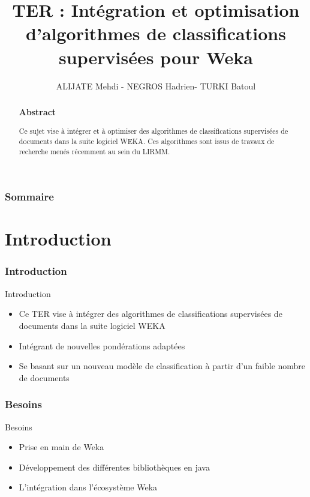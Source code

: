 \documentclass[12pt]{beamer}
\author{ALIJATE Mehdi -  NEGROS Hadrien- TURKI Batoul}
\title{TER :  Intégration et optimisation d’algorithmes de classifications supervisées pour Weka
}
\institute{Université Montpellier 2 - LIRMM}
\begin{document}
\begin{frame}
\titlepage 
\end{frame}

\begin{frame}
\begin{abstract}

\frametitle{Abstract}
\begin{center}
Ce sujet vise à intégrer et à optimiser des algorithmes de classifications supervisées de documents dans la suite logiciel WEKA. Ces algorithmes sont issus de travaux de recherche menés récemment au sein du LIRMM.
\end{center}
\end{abstract}
\end{frame}

\begin{frame}
\tableofcontents
\frametitle{Sommaire}


\end{frame}


\section{Introduction}



\begin{frame}
\frametitle{Introduction}
\begin{block}{Introduction}
\begin{itemize}
\item Ce TER vise à intégrer des algorithmes de classifications supervisées de documents dans la suite logiciel WEKA 
\item Intégrant de nouvelles pondérations adaptées
\item Se basant sur un nouveau modèle de classification à partir d’un faible nombre de documents
\end{itemize} 
\end{block}
\end{frame}

\begin{frame}
\frametitle{Besoins}
\begin{block}{Besoins}
\begin{itemize}
\item Prise en main de Weka
\item Développement des différentes bibliothèques en java
\item L'intégration dans l’écosystème Weka
\end{itemize}
\end{block}

\end{frame}
\end{document}

